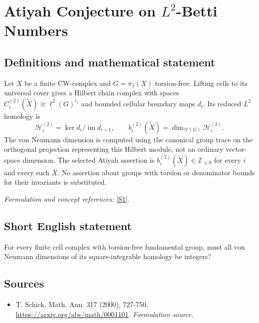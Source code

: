 \documentclass[11pt]{article}
\begin{document}
\section*{\texorpdfstring{Atiyah Conjecture on $L^2$-Betti Numbers}{Atiyah Conjecture on \$L\textasciicircum{}2\$-Betti Numbers}}\label{30000209}
\subsection{Definitions and mathematical statement}
Let $X$ be a finite CW-complex and $G=\pi_1(X)$ torsion-free. Lifting cells to its universal cover gives a Hilbert chain complex with spaces $C_i^{(2)}(\widetilde X)\cong\ell^2(G)^{c_i}$ and bounded cellular boundary maps $d_i$. Its reduced $L^2$ homology is
\[
 \mathcal H_i^{(2)}=\ker d_i\big/\overline{\operatorname{im}d_{i+1}},
 \qquad b_i^{(2)}(\widetilde X)=\dim_{\mathcal N(G)}\mathcal H_i^{(2)}.
\]
The von Neumann dimension is computed using the canonical group trace on the orthogonal projection representing this Hilbert module, not an ordinary vector-space dimension. The selected Atiyah assertion is $b_i^{(2)}(\widetilde X)\in{\mathbb{Z}}_{\ge0}$ for every $i$ and every such $X$. No assertion about groups with torsion or denominator bounds for their invariants is substituted.
\par\smallskip\textit{Formulation and concept references:} \href{https://arxiv.org/abs/math/0001101}{[S1]}.

\subsection{Short English statement}
For every finite cell complex with torsion-free fundamental group, must all von Neumann dimensions of its square-integrable homology be integers?
\subsection{Sources}
\begin{itemize}
\item[S1]T. Schick, Math. Ann. 317 (2000), 727-750.
\url{https://arxiv.org/abs/math/0001101}.
\textit{Formulation source.}
\end{itemize}
\end{document}
